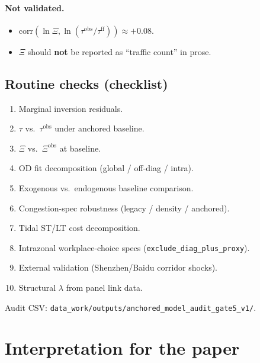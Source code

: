 \documentclass[12pt]{article}
\newcommand{\obs}{\mathrm{obs}}
\newcommand{\ff}{\mathrm{ff}}
\newcommand{\corr}{\mathrm{corr}}
\begin{document}
\paragraph{Not validated.}
\begin{itemize}[leftmargin=2em]
  \item $\corr(\ln\Xi,\ln(\tau^{\obs}/\tau^{\ff}))\approx +0.08$.
  \item $\Xi$ should \textbf{not} be reported as ``traffic count'' in prose.
\end{itemize}

\subsection{Routine checks (checklist)}

\begin{enumerate}[leftmargin=2em]
  \item[\checkmark] Marginal inversion residuals.
  \item[\checkmark] $\tau$ vs.\ $\tau^{\obs}$ under anchored baseline.
  \item[\checkmark] $\Xi$ vs.\ $\Xi^{\obs}$ at baseline.
  \item[\checkmark] OD fit decomposition (global / off-diag / intra).
  \item[\checkmark] Exogenous vs.\ endogenous baseline comparison.
  \item[\checkmark] Congestion-spec robustness (legacy / density / anchored).
  \item[\checkmark] Tidal ST/LT cost decomposition.
  \item[$\circ$] Intrazonal workplace-choice specs (\texttt{exclude\_diag\_plus\_proxy}).
  \item[$\circ$] External validation (Shenzhen/Baidu corridor shocks).
  \item[$\circ$] Structural $\lambda$ from panel link data.
\end{enumerate}

Audit CSV:
\texttt{data\_work/outputs/anchored\_model\_audit\_gate5\_v1/}.

\section{Interpretation for the paper}\label{sec:interpretation}
\end{document}
